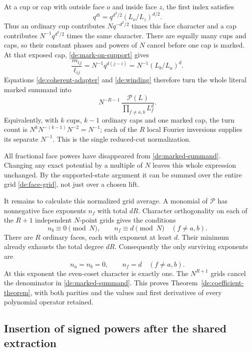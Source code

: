 At a cup or cap with outside face \(o\) and inside face \(z\),
the first index satisfies
\[
 q^{di}=q^{d^2/2}(L_o/L_z)^{d/2}.
\]
Thus an ordinary cup contributes \(Nq^{-d^2/2}\) times this
face character and a cap contributes \(N^{-1}q^{d^2/2}\) times
the same character. There are equally many cups and caps, so
their constant phases and powers of \(N\) cancel before one cap
is marked. At that exposed cap, \eqref{de:mark-on-support} gives
\begin{equation}\label{de:mark-ratio}
 \frac{m_{ij}}{\ell_{ij}}
      =N^{-1}q^{d(j-i)}
      =N^{-1}(L_b/L_a)^d.
\end{equation}
Equations \eqref{de:coherent-adapter} and \eqref{de:winding}
therefore turn the whole literal marked summand into
\begin{equation}\label{de:marked-summand}
 N^{-R-1}\,
       \frac{\mathcal P(L)}{\prod_{f\ne a,b}L_f^d}.
\end{equation}
Equivalently, with \(k\) cups, \(k-1\) ordinary caps and one
marked cap, the turn count is
\(N^kN^{-(k-1)}N^{-2}=N^{-1}\); each of the \(R\) local Fourier
inversions supplies its separate \(N^{-1}\).
This is the single reduced-cut normalization.

All fractional face powers have disappeared from
\eqref{de:marked-summand}. Changing any exact potential by a
multiple of \(N\) leaves this whole expression unchanged. By
the supported-state argument it can be summed over the entire
grid \eqref{de:face-grid}, not just over a chosen lift.

It remains to calculate this normalized grid average.
A monomial of \(\mathcal P\) has nonnegative face exponents \(n_f\)
with total \(dR\). Character orthogonality on each of the
\(R+1\) independent \(N\)-point grids gives the conditions
\[
 n_b\equiv0\pmod N,\qquad n_f\equiv d\pmod N
                       \quad(f\ne a,b).
\]
There are \(R\) ordinary faces, each with exponent at least \(d\).
Their minimum already exhausts the total degree \(dR\).
Consequently the only surviving exponents are
\begin{equation}\label{de:unique-target}
             n_a=n_b=0,\qquad n_f=d\quad(f\ne a,b).
\end{equation}
At this exponent the even-coset character is exactly one.
The \(N^{R+1}\) grids cancel the denominator in
\eqref{de:marked-summand}. This proves
Theorem~\ref{de:coefficient-theorem}, with both parities and the
values and first derivatives of every polynomial operator retained.

\subsection{Insertion of signed powers after the shared extraction}

